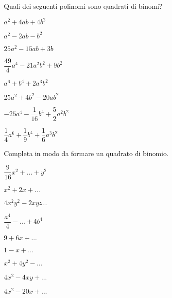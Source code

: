 \begin{esercizio}
 \label{ese:11.2}
Quali dei seguenti polinomi sono quadrati di binomi?

\begin{multicols}{2}
\TabPositions{4cm}
\begin{enumeratea}
\spazielenx
\item $a^{2}+4{ab}+4b^{2}$ \tab\boxSi\quad\boxNo
\item $a^{2}-2{ab}-b^{2}$ \tab\boxSi\quad\boxNo
\item $25a^{2}-15{ab}+3b$ \tab\boxSi\quad\boxNo
\item $\dfrac{49}{4}a^{4}-21a^{2}b^{2}+9b^{2}$ \tab\boxSi\quad\boxNo
\item $a^{6}+b^{4}+2a^{3}b^{2}$ \tab\boxSi\quad\boxNo
\item $25a^{2}+4b^{2}-20{ab}^{2}$ \tab\boxSi\quad\boxNo
\item $-25a^{4}-\dfrac{1}{16}b^{4}+\dfrac{5}{2}a^{2}b^{2}$ \tab\boxSi\quad\boxNo
\item $\dfrac{1}{4}a^{6}+\dfrac{1}{9}b^{4}+\dfrac{1}{6}a^{3}b^{2}$ 
\tab\boxSi\quad\boxNo
\end{enumeratea}
\end{multicols}
\end{esercizio}

\begin{esercizio}
 \label{ese:11.3}
Completa in modo da formare un quadrato di binomio.
\begin{multicols}{3}
\begin{enumeratea}
\spazielenx
 \item $\dfrac{9}{16}x^{2}+\ldots +y^{2}$
 \item $x^{2} + 2x + \ldots $
 \item $4x^{2}y^{2} - 2xyz \ldots $
 \item $\dfrac{a^{4}}{4}-\ldots+4b^{4}$
 \item $9+6x+ \ldots $
 \item $1-x+ \ldots $
 \item $x^{2}+4y^{2}-\ldots $
 \item $4x^{2}-4{xy}+ \ldots $
 \item $4x^{2}-20x+\ldots $
\end{enumeratea}
\end{multicols}
\end{esercizio}

\newpage %

